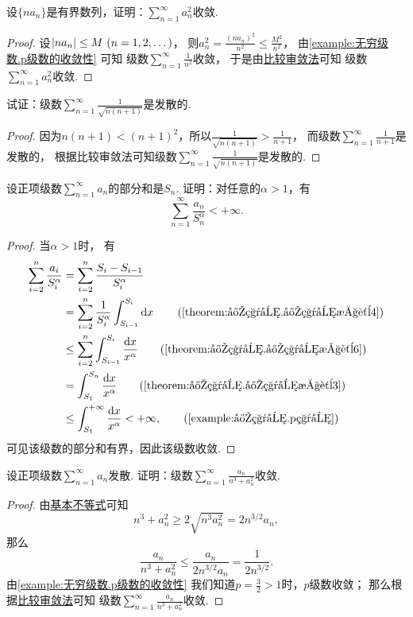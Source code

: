 \begin{example}
设\(\{n a_n\}\)是有界数列，证明：\(\sum_{n=1}^\infty a_n^2\)收敛.
\begin{proof}
设\(\abs{n a_n} \leq M\ (n=1,2,\dotsc)\)，
则\(a_n^2 = \frac{(n a_n)^2}{n^2} \leq \frac{M^2}{n^2}\)，
由\cref{example:无穷级数.p级数的收敛性} 可知
级数\(\sum_{n=1}^\infty \frac1{n^2}\)收敛，
于是由\hyperref[theorem:无穷级数.正项级数的比较审敛法]{比较审敛法}可知
级数\(\sum_{n=1}^\infty a_n^2\)收敛.
\end{proof}
\end{example}

\begin{example}
试证：级数\(\sum_{n=1}^\infty \frac{1}{\sqrt{n(n+1)}}\)是发散的.
\begin{proof}
因为\(n(n+1) < (n+1)^2\)，所以\(\frac{1}{\sqrt{n(n+1)}} > \frac{1}{n+1}\)，
而级数\(\sum_{n=1}^\infty \frac{1}{n+1}\)是发散的，
根据比较审敛法可知级数\(\sum_{n=1}^\infty \frac{1}{\sqrt{n(n+1)}}\)是发散的.
\end{proof}
\end{example}

\begin{example}
设正项级数\(\sum_{n=1}^\infty a_n\)的部分和是\(S_n\).
证明：对任意的\(\alpha>1\)，有\[
	\sum_{n=1}^\infty \frac{a_n}{S_n^\alpha} < +\infty.
\]
\begin{proof}
当\(\alpha>1\)时，
有\begin{align*}
	\sum_{i=2}^n \frac{a_i}{S_i^\alpha}
	&= \sum_{i=2}^n \frac{S_i-S_{i-1}}{S_i^\alpha} \\
	&= \sum_{i=2}^n \frac{1}{S_i^\alpha} \int_{S_{i-1}}^{S_i} \dd{x}
			\tag{\cref{theorem:定积分.定积分性质4}} \\
	&\leq \sum_{i=2}^n \int_{S_{i-1}}^{S_i} \frac{\dd{x}}{x^\alpha}
			\tag{\cref{theorem:定积分.定积分性质6}} \\
	&= \int_{S_1}^{S_n} \frac{\dd{x}}{x^\alpha}
			\tag{\cref{theorem:定积分.定积分性质3}} \\
	&\leq \int_{S_1}^{+\infty} \frac{\dd{x}}{x^\alpha}
	< +\infty,
			\tag{\cref{example:定积分.p积分}}
\end{align*}
可见该级数的部分和有界，因此该级数收敛.
\end{proof}
\end{example}

\begin{example}
设正项级数\(\sum_{n=1}^\infty a_n\)发散.
证明：级数\(\sum_{n=1}^\infty \frac{a_n}{n^3+a_n^2}\)收敛.
\begin{proof}
由\hyperref[theorem:不等式.基本不等式2]{基本不等式}可知\[
	n^3+a_n^2\geq2\sqrt{n^3 a_n^2}=2n^{3/2}a_n,
\]
那么\[
	\frac{a_n}{n^3+a_n^2}\leq\frac{a_n}{2n^{3/2}a_n}=\frac{1}{2n^{3/2}}.
\]
由\cref{example:无穷级数.p级数的收敛性}
我们知道\(p=\frac{3}{2}>1\)时，\(p\)级数收敛；
那么根据\hyperref[theorem:无穷级数.正项级数的比较审敛法]{比较审敛法}可知
级数\(\sum_{n=1}^\infty \frac{a_n}{n^3+a_n^2}\)收敛.
\end{proof}
\end{example}

